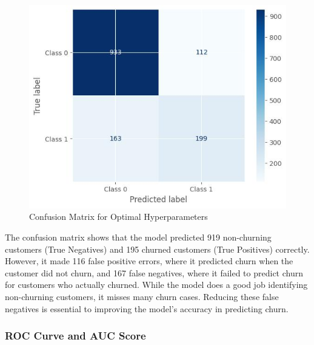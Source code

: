 \begin{figure}[hbt!]
    \centering
    \includegraphics[width=1\linewidth]{Images/5.7.3.a.jpg}
    \caption{Confusion Matrix for Optimal Hyperparameters}
    \label{fig:enter-label}
\end{figure}

The confusion matrix shows that the model predicted 919 non-churning customers (True Negatives) and 195 churned customers (True Positives) correctly. However, it made 116 false positive errors, where it predicted churn when the customer did not churn, and 167 false negatives, where it failed to predict churn for customers who actually churned. While the model does a good job identifying non-churning customers, it misses many churn cases. Reducing these false negatives is essential to improving the model’s accuracy in predicting churn.

\subsubsection{ROC Curve and AUC Score}

